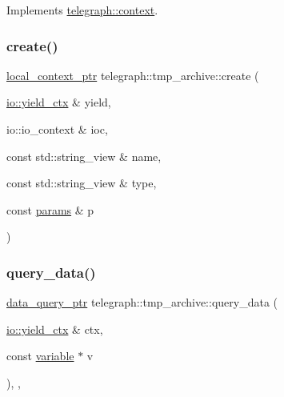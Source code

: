 Implements \hyperlink{classtelegraph_1_1context_a0798d49ea0874a870d4c980f6f09b6c2}{telegraph\+::context}.

\mbox{\label{classtelegraph_1_1tmp__archive_a3e59e0a0a2ef78286399fd6f67b4431d}} 
\subsubsection{\texorpdfstring{create()}{create()}}
{\footnotesize\ttfamily \hyperlink{namespacetelegraph_ab59c7b38d99a98b4acc22433c920b1e6}{local\+\_\+context\+\_\+ptr} telegraph\+::tmp\+\_\+archive\+::create (\begin{DoxyParamCaption}\item[{\hyperlink{structboost_1_1asio_1_1yield__ctx}{io\+::yield\+\_\+ctx} \&}]{yield,  }\item[{io\+::io\+\_\+context \&}]{ioc,  }\item[{const std\+::string\+\_\+view \&}]{name,  }\item[{const std\+::string\+\_\+view \&}]{type,  }\item[{const \hyperlink{classtelegraph_1_1params}{params} \&}]{p }\end{DoxyParamCaption})\hspace{0.3cm}{\ttfamily [static]}}

\mbox{\label{classtelegraph_1_1tmp__archive_a7f2d18d2a4c9a7fd65d9752c8f4ce4d5}} 
\subsubsection{\texorpdfstring{query\+\_\+data()}{query\_data()}\hspace{0.1cm}{\footnotesize\ttfamily [1/2]}}
{\footnotesize\ttfamily \hyperlink{namespacetelegraph_a6ffe775ac48dca2a4013b53d692199c8}{data\+\_\+query\+\_\+ptr} telegraph\+::tmp\+\_\+archive\+::query\+\_\+data (\begin{DoxyParamCaption}\item[{\hyperlink{structboost_1_1asio_1_1yield__ctx}{io\+::yield\+\_\+ctx} \&}]{ctx,  }\item[{const \hyperlink{classtelegraph_1_1variable}{variable} $\ast$}]{v }\end{DoxyParamCaption})\hspace{0.3cm}{\ttfamily [inline]}, {\ttfamily [override]}, {\ttfamily [virtual]}}



